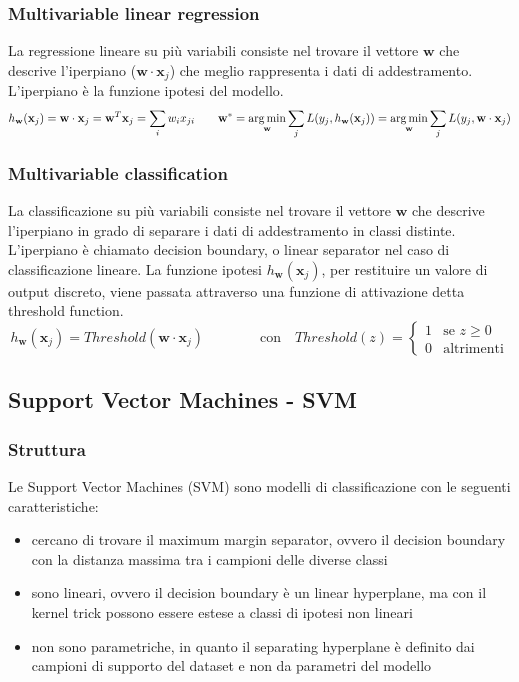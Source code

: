 \subsubsection*{Multivariable linear regression}
La regressione lineare su più variabili consiste nel trovare il vettore \(\textbf{w}\) che descrive l'iperpiano
(\(\textbf{w} \cdot \textbf{x}_j\)) che meglio rappresenta i dati di addestramento. L'iperpiano è la funzione ipotesi del modello.
\[h_\textbf{w}(\textbf{x}_j) = \textbf{w} \cdot \textbf{x}_j = \textbf{w}^T \textbf{x}_j = \sum_{i} w_i x_{ji} \qquad \textbf{w}^* = \operatorname*{arg\,min}_\textbf{w} \sum_j L(y_j, h_\textbf{w}(\textbf{x}_j)) = \operatorname*{arg\,min}_\textbf{w} \sum_j L(y_j, \textbf{w} \cdot \textbf{x}_j)\]


\subsubsection*{Multivariable classification}
La classificazione su più variabili consiste nel trovare il vettore \(\textbf{w}\) che descrive l'iperpiano in grado di
separare i dati di addestramento in classi distinte. L'iperpiano è chiamato decision boundary, o linear separator nel
caso di classificazione lineare. La funzione ipotesi \(h_\textbf{w}(\textbf{x}_j)\), per restituire un valore di output
discreto, viene passata attraverso una funzione di attivazione detta threshold function.
\[h_\textbf{w}(\textbf{x}_j) = Threshold(\textbf{w} \cdot \textbf{x}_j) \qquad\qquad \text{con} \quad Threshold(z) = \begin{cases} 1 & \text{se } z \ge 0 \\ 0 & \text{altrimenti} \end{cases}\]


\subsection{Support Vector Machines - SVM}
\subsubsection*{Struttura}
Le Support Vector Machines (SVM) sono modelli di classificazione con le seguenti caratteristiche:
\begin{itemize}
	\item cercano di trovare il maximum margin separator, ovvero il decision boundary con la distanza massima tra i campioni
	delle diverse classi
	\item sono lineari, ovvero il decision boundary è un linear hyperplane, ma con il kernel trick possono essere estese a
	classi di ipotesi non lineari
	\item non sono parametriche, in quanto il separating hyperplane è definito dai campioni di supporto del dataset e non
	da parametri del modello
\end{itemize}

